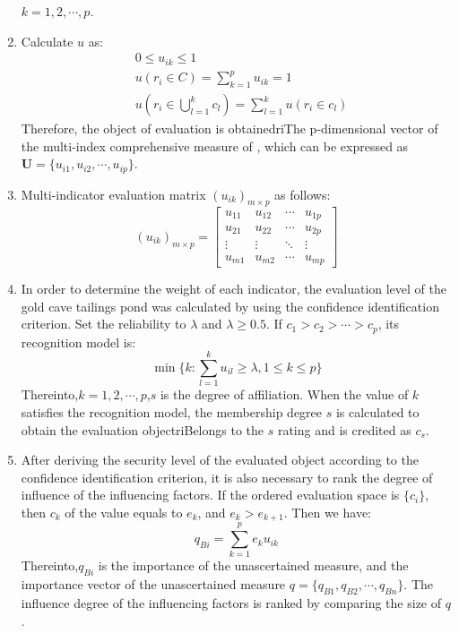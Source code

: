 \documentclass[12pt]{article}  %
\begin{document}
\begin{enumerate}
\hspace{4.25em}$k=1,2,\cdots ,p$.
\item Calculate $u$ as:
\begin{eqnarray}
    &0\le u_{ik}\le 1\\
    &u(r_i\in C)=\sum_{k=1}^{p}u_{ik}=1\\
    &u(r_i\in \bigcup_{l=1}^{k}c_l)=\sum_{l=1}^{k}u(r_i\in c_l)
\end{eqnarray}
Therefore, the object of evaluation is obtainedriThe p-dimensional vector of the multi-index comprehensive measure of , which can be expressed as $\bm{U}=\{u_{i1},u_{i2},\cdots ,u_{ip}\}$. 
\item Multi-indicator evaluation matrix $(u_{ik})_{m\times p}$ as follows:
\begin{equation}
    (u_{ik})_{m\times p}=\begin{bmatrix}
 u_{11} &u_{12}  &\cdots   &u_{1p} \\
  u_{21}&u_{22}  & \cdots  &u_{2p} \\
  \vdots & \vdots &  \ddots & \vdots\\
 u_{m1} &u_{m2}  &\cdots   &u_{mp}
\end{bmatrix} 
\end{equation}
    \item In order to determine the weight of each indicator, the evaluation level of the gold cave tailings pond was calculated by using the confidence identification criterion. Set the reliability to $\lambda$ and $\lambda \ge 0.5$. If $c_1>c_2>\cdots >c_p$, its recognition model is:
    \begin{equation}
        \min \{k:\sum_{l=1}^{k}u_{il}\ge \lambda,1\le k\le p\}
    \end{equation}
Thereinto,$k=1,2,\cdots ,p$,$s$ is the degree of affiliation. When the value of $k$ satisfies the recognition model, the membership degree $s$ is calculated to obtain the evaluation objectriBelongs to the $s$ rating and is credited as $c_s$.
    \item After deriving the security level of the evaluated object according to the confidence identification criterion, it is also necessary to rank the degree of influence of the influencing factors. If the ordered evaluation space is $\{c_i\}$, then $c_k$ of the value equals to $e_k$, and $e_k>e_{k+1}$. Then we have:
    \begin{equation}
        q_{Bi}=\sum_{k=1}^{p}e_ku_{ik}
    \end{equation}
Thereinto,$q_{Bi}$ is the importance of the unascertained measure, and the importance vector of the unascertained measure $q=\{q_{B1}, q_{B2},\cdots , q_{Bn}\}$. The influence degree of the influencing factors is ranked by comparing the size of \rm{$q$}.
\end{enumerate}
\end{document}
